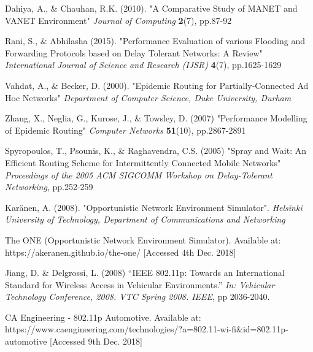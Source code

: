 \documentclass{article}
\begin{document}
\begin{thebibliography}{20}
Dahiya, A., \& Chauhan, R.K. (2010).
"A Comparative Study of MANET and VANET Environment"
\textit{Journal of Computing} \textbf{2}(7), pp.87-92

Rani, S., \& Abhilasha (2015).
"Performance Evaluation of various Flooding and
Forwarding Protocols based on Delay Tolerant
Networks: A Review"
\textit{International Journal of Science and Research (IJSR)} \textbf{4}(7), pp.1625-1629

Vahdat, A., \& Becker, D. (2000).
"Epidemic Routing for Partially-Connected Ad Hoc Networks"
\textit{Department of Computer Science, Duke University, Durham}

Zhang, X., Neglia, G., Kurose, J., \& Towsley, D. (2007)
"Performance Modelling of Epidemic Routing"
\textit{Computer Networks} \textbf{51}(10), pp.2867-2891

Spyropoulos, T., Psounis, K., \& Raghavendra, C.S. (2005)
"Spray and Wait: An Efficient Routing Scheme for
Intermittently Connected Mobile Networks"
\textit{Proceedings of the 2005 ACM SIGCOMM Workshop on Delay-Tolerant Networking}, pp.252-259

Karänen, A. (2008).
"Opportunistic Network Environment Simulator".
\textit{Helsinki University of Technology, Department of Communications and Networking}

The ONE (Opportunistic Network Environment Simulator). Available at: https://akeranen.github.io/the-one/ [Accessed 4th Dec. 2018]

Jiang, D. \& Delgrossi, L. (2008)
``IEEE 802.11p: Towards an International Standard for Wireless Access in Vehicular Environments.'' 
\textit{In: Vehicular Technology Conference, 2008. VTC Spring 2008. IEEE}, pp 2036-2040.

CA Engineering - 802.11p Automotive. Available at: https://www.caengineering.com/technologies/?a=802.11-wi-fi\&id=802.11p-automotive [Accessed 9th Dec. 2018]

\end{thebibliography}
 
\end{document}
